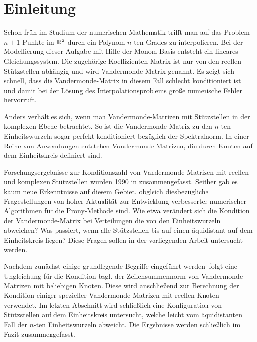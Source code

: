 \chapter{Einleitung}


Schon früh im Studium der numerischen Mathematik trifft man auf das Problem
$n+1$ Punkte im $\mathbb{R}^2$ durch ein Polynom $n$-ten Grades zu interpolieren.  Bei
der Modellierung dieser Aufgabe mit Hilfe der Monom-Basis entsteht ein lineares
Gleichungssystem.  Die zugehörige Koeffizienten-Matrix ist nur von den
reellen Stützstellen abhängig und wird Vandermonde-Matrix genannt.  Es zeigt sich
schnell, dass die Vandermonde-Matrix in diesem Fall schlecht konditioniert ist
und damit bei der Lösung des Interpolationsproblems große numerische Fehler
hervorruft.

Anders verhält es sich, wenn man Vandermonde-Matrizen mit Stützstellen in der
komplexen Ebene betrachtet.  So ist die Vandermonde-Matrix zu den $n$-ten
Einheitswurzeln sogar perfekt konditioniert bezüglich der Spektralnorm.  In
einer Reihe von Anwendungen entstehen Vandermonde-Matrizen, die durch Knoten
auf dem Einheitskreis definiert sind.

Forschungsergebnisse zur Konditionszahl von Vandermonde-Matrizen mit reellen
und komplexen Stützstellen wurden 1990 in \cite{gautschi1} zusammengefasst.
Seither gab es kaum neue Erkenntnisse auf diesem Gebiet, obgleich
diesbezügliche Fragestellungen von hoher Aktualität zur Entwicklung
verbesserter numerischer Algorithmen für die Prony-Methode sind.
Wie etwa verändert sich die Kondition der Vandermonde-Matrix bei Verteilungen
die von den Einheitswurzeln abweichen?  Was passiert, wenn alle Stützstellen
bis auf einen äquidistant auf dem Einheitskreis liegen?
Diese Fragen sollen in der vorliegenden Arbeit untersucht werden.

Nachdem zunächst einige grundlegende Begriffe eingeführt werden, folgt eine
Ungleichung für die Kondition bzgl. der Zeilensummennorm von
Vandermonde-Matrizen mit beliebigen Knoten.  Diese wird anschließend zur
Berechnung der Kondition einiger spezieller Vandermonde-Matrizen mit reellen
Knoten verwendet.  Im letzten Abschnitt wird schließlich eine Konfiguration von
Stützstellen auf dem Einheitskreis untersucht, welche leicht vom äquidistanten
Fall der $n$-ten Einheitswurzeln abweicht. Die Ergebnisse werden schließlich im
Fazit zusammengefasst.
